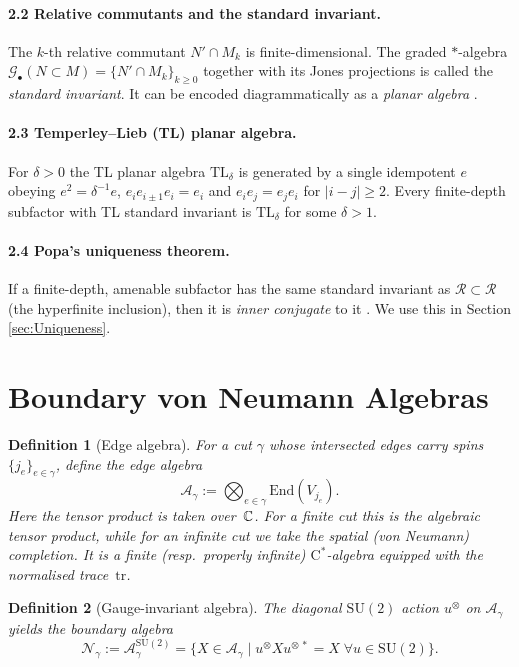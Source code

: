 \documentclass[11pt]{article}
\newtheorem{definition}{Definition}[section]
\begin{document}
\paragraph{2.2  Relative commutants and the standard invariant.}
The $k$-th relative commutant $N'\!\cap M_k$ is finite-dimensional.
The graded $\ast$-algebra
\(
   \mathcal G_{\bullet}(N\subset M)
   =\bigl\{N'\!\cap M_k\}_{k\ge0}
\)
together with its Jones projections is called the \emph{standard
invariant}.  It can be encoded diagrammatically as a \emph{planar algebra}
\cite{JonesPA}.

\paragraph{2.3  Temperley–Lieb (TL) planar algebra.}
For $\delta>0$ the TL planar algebra $\mathrm{TL}_\delta$ is generated by
a single idempotent $e$ obeying
$e^{2}=\delta^{-1}e$,
$e_ie_{i\pm1}e_i=e_i$ and $e_ie_j=e_je_i$ for $|i-j|\ge2$.
Every finite-depth subfactor with TL standard invariant is
$\mathrm{TL}_\delta$ for some $\delta>1$.

\paragraph{2.4  Popa’s uniqueness theorem.}
If a finite-depth, amenable subfactor has the same standard invariant as
$\mathcal R\subset\mathcal R$ (the hyperfinite inclusion), then it is
\emph{inner conjugate} to it \cite[Thm.~4.5]{PopaCBMS}.  We use this in
Section \ref{sec:Uniqueness}.


\section{Boundary von Neumann Algebras}

\begin{definition}[Edge algebra]
For a cut $\gamma$ whose intersected edges carry spins
$\{j_e\}_{e\in\gamma}$, define the \emph{edge algebra}
\[
  \mathcal A_{\gamma}
  := \bigotimes_{e\in\gamma} \mathrm{End}(V_{j_e}).
\]
Here the tensor product is taken over~$\Bbb C$.
For a finite cut this is the algebraic tensor product,
while for an infinite cut we take the spatial (von Neumann) completion.
It is a finite (resp.\ properly infinite) $\mathrm C^\ast$-algebra
equipped with the normalised trace~$\mathrm{tr}$.
\end{definition}

\begin{definition}[Gauge-invariant algebra]
The diagonal $\mathrm{SU}(2)$ action $u^{\otimes}$ on
$\mathcal A_\gamma$ yields the \emph{boundary algebra}
\[
  \mathcal N_{\gamma} := 
  \mathcal A_{\gamma}^{\mathrm{SU}(2)}
  =
  \{X\in\mathcal A_{\gamma}\mid
    u^{\otimes} X u^{\otimes\,*}=X\;\forall u\in \mathrm{SU}(2)\}.
\]
\end{definition}
\end{document}
